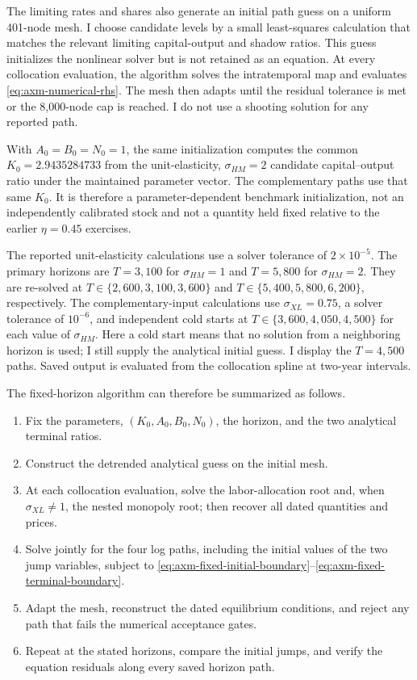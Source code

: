 The limiting rates and shares also generate an initial path guess on a uniform
401-node mesh. I choose candidate levels by a small least-squares calculation
that matches the relevant limiting capital-output and shadow ratios. This guess
initializes the nonlinear solver but is not retained as an equation. At every
collocation evaluation, the algorithm solves the intratemporal map and evaluates
\eqref{eq:axm-numerical-rhs}. The mesh then adapts until the residual tolerance is
met or the 8,000-node cap is reached. I do not use a shooting solution for any
reported path.

With \(A_0=B_0=N_0=1\), the same initialization computes the common
\(K_0=2.9435284733\) from the unit-elasticity, \(\sigma_{HM}=2\) candidate
capital--output ratio under the maintained parameter vector. The complementary
paths use that same \(K_0\). It is therefore a parameter-dependent benchmark
initialization, not an independently calibrated stock and not a quantity held
fixed relative to the earlier \(\eta=0.45\) exercises.

The reported unit-elasticity calculations use a solver tolerance of
\(2\times10^{-5}\). The primary horizons are \(T=3{,}100\) for
\(\sigma_{HM}=1\) and \(T=5{,}800\) for \(\sigma_{HM}=2\). They are re-solved at
\(T\in\{2{,}600,3{,}100,3{,}600\}\) and
\(T\in\{5{,}400,5{,}800,6{,}200\}\), respectively. The complementary-input
calculations use \(\sigma_{XL}=0.75\), a solver tolerance of \(10^{-6}\), and
independent cold starts at \(T\in\{3{,}600,4{,}050,4{,}500\}\) for each value of
\(\sigma_{HM}\). Here a cold start means that no solution from a neighboring
horizon is used; I still supply the analytical initial guess. I display the
\(T=4{,}500\) paths. Saved output is evaluated from the collocation
spline at two-year intervals.

The fixed-horizon algorithm can therefore be summarized as follows.
\begin{enumerate}[label=\textbf{Step \arabic*.},leftmargin=4.5em,labelsep=0.6em]
 \item Fix the parameters, \((K_0,A_0,B_0,N_0)\), the horizon, and the two analytical
 terminal ratios.
 \item Construct the detrended analytical guess on the initial mesh.
 \item At each collocation evaluation, solve the labor-allocation root and, when
 \(\sigma_{XL}\neq1\), the nested monopoly root; then recover all dated
 quantities and prices.
 \item Solve jointly for the four log paths, including the initial values of the
 two jump variables, subject to
 \eqref{eq:axm-fixed-initial-boundary}--\eqref{eq:axm-fixed-terminal-boundary}.
 \item Adapt the mesh, reconstruct the dated equilibrium conditions, and reject
 any path that fails the numerical acceptance gates.
 \item Repeat at the stated horizons, compare the initial jumps, and verify the
 equation residuals along every saved horizon path.
\end{enumerate}

